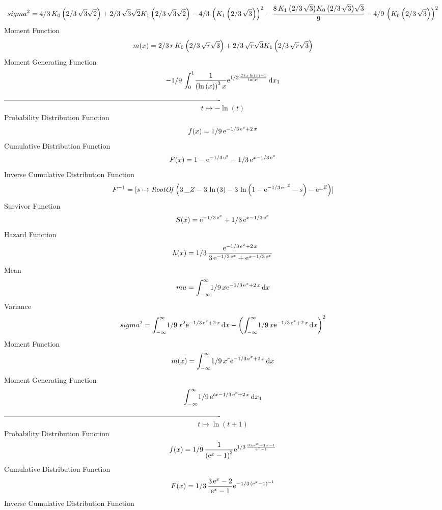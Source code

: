 \documentclass[12pt]{article}
\begin{document}
 $$ sigma^2 = 4/3\,{{\sl K}_{0}\left(2/3\,\sqrt {3}\sqrt {2}\right)}+2/3\,\sqrt {3}
\sqrt {2}{{\sl K}_{1}\left(2/3\,\sqrt {3}\sqrt {2}\right)}-4/3\,
 \left( {{\sl K}_{1}\left(2/3\,\sqrt {3}\right)} \right) ^{2}-{\frac {
8\,{{\sl K}_{1}\left(2/3\,\sqrt {3}\right)}{{\sl K}_{0}\left(2/3\,
\sqrt {3}\right)}\sqrt {3}}{9}}-4/9\, \left( {{\sl K}_{0}\left(2/3\,
\sqrt {3}\right)} \right) ^{2}
$$Moment Function 
 $$ m(x) = 2/3\,r\,{{\sl K}_{0}\left(2/3\,\sqrt {r}\sqrt {3}\right)}+2/3\,\sqrt {
r}\sqrt {3}{{\sl K}_{1}\left(2/3\,\sqrt {r}\sqrt {3}\right)}
$$ Moment Generating Function 
 $$-1/9\,\int_{0}^{1}\!{\frac {1}{ \left( \ln  \left( x \right)  \right) 
^{3}x}{{\rm e}^{1/3\,{\frac {3\,tx\ln  \left( x \right) +1}{\ln 
 \left( x \right) }}}}}\,{\rm d}x_{{1}}
$$-------------------------------------------------------------------------------------------  \\$$t\mapsto -\ln  \left( t \right) 
$$Probability Distribution Function 
$$  f(x)=1/9\,{{\rm e}^{-1/3\,{{\rm e}^{x}}+2\,x}}
$$Cumulative Distribution Function  
 $$F(x)=1-{{\rm e}^{-1/3\,{{\rm e}^{x}}}}-1/3\,{{\rm e}^{x-1/3\,{{\rm e}^{x}}}
}
$$ Inverse Cumulative Distribution Function 
  $$F^{-1} = [s\mapsto {\it RootOf} \left( 3\,{\it \_Z}-3\,\ln  \left( 3 \right) -3
\,\ln  \left( 1-{{\rm e}^{-1/3\,{{\rm e}^{{\it \_Z}}}}}-s \right) -{
{\rm e}^{{\it \_Z}}} \right) ]
$$Survivor Function 
 $$ S(x)={{\rm e}^{-1/3\,{{\rm e}^{x}}}}+1/3\,{{\rm e}^{x-1/3\,{{\rm e}^{x}}}}
$$ Hazard Function 
 $$ h(x)=1/3\,{\frac {{{\rm e}^{-1/3\,{{\rm e}^{x}}+2\,x}}}{3\,{{\rm e}^{-1/3\,
{{\rm e}^{x}}}}+{{\rm e}^{x-1/3\,{{\rm e}^{x}}}}}}
$$Mean 
 $$ mu=\int_{-\infty }^{\infty }\!1/9\,x{{\rm e}^{-1/3\,{{\rm e}^{x}}+2\,x}}
\,{\rm d}x
$$ Variance 
 $$ sigma^2 = \int_{-\infty }^{\infty }\!1/9\,{x}^{2}{{\rm e}^{-1/3\,{{\rm e}^{x}}+2
\,x}}\,{\rm d}x- \left( \int_{-\infty }^{\infty }\!1/9\,x{{\rm e}^{-1/
3\,{{\rm e}^{x}}+2\,x}}\,{\rm d}x \right) ^{2}
$$Moment Function 
 $$ m(x) = \int_{-\infty }^{\infty }\!1/9\,{x}^{r}{{\rm e}^{-1/3\,{{\rm e}^{x}}+2
\,x}}\,{\rm d}x
$$ Moment Generating Function 
 $$\int_{-\infty }^{\infty }\!1/9\,{{\rm e}^{tx-1/3\,{{\rm e}^{x}}+2\,x}}
\,{\rm d}x_{{1}}
$$-------------------------------------------------------------------------------------------  \\$$t\mapsto \ln  \left( t+1 \right) 
$$Probability Distribution Function 
$$  f(x)=1/9\,{\frac {1}{ \left( {{\rm e}^{x}}-1 \right) ^{3}}{{\rm e}^{1/3\,{
\frac {3\,x{{\rm e}^{x}}-3\,x-1}{{{\rm e}^{x}}-1}}}}}
$$Cumulative Distribution Function  
 $$F(x)=1/3\,{\frac {3\,{{\rm e}^{x}}-2}{{{\rm e}^{x}}-1}{{\rm e}^{-1/3\,
 \left( {{\rm e}^{x}}-1 \right) ^{-1}}}}
$$ Inverse Cumulative Distribution Function 
\end{document}
